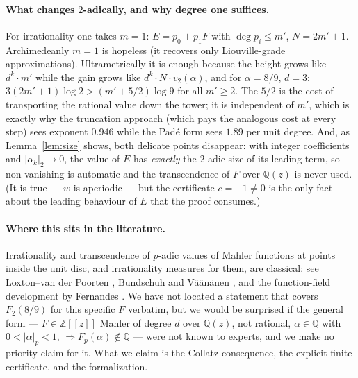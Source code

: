 \documentclass[11pt]{article}
\theoremstyle{definition}
\newcommand{\Z}{\mathbb{Z}}
\newcommand{\Q}{\mathbb{Q}}
\begin{document}
\paragraph{What changes $2$-adically, and why degree one suffices.}
For irrationality one takes $m = 1$: $E = p_0 + p_1 F$ with $\deg p_i
\le m'$, $N = 2m' + 1$. Archimedeanly $m = 1$ is hopeless (it recovers
only Liouville-grade approximations). Ultrametrically it is enough
because the height grows like $d^k \cdot m'$ while the gain grows like
$d^k \cdot N \cdot v_2(\alpha)$, and for $\alpha = 8/9$, $d = 3$:
$3(2m'+1)\log 2 > (m' + 5/2)\log 9$ for all $m' \ge 2$. The $5/2$ is
the cost of transporting the rational value down the tower; it is
independent of $m'$, which is exactly why the truncation approach
(which pays the analogous cost at every step) sees exponent $0.946$
while the Pad\'e form sees $1.89$ per unit degree. And, as
Lemma~\ref{lem:size} shows, both delicate points disappear: with
integer coefficients and $|\alpha_k|_2 \to 0$, the value of $E$ has
\emph{exactly} the $2$-adic size of its leading term, so non-vanishing
is automatic and the transcendence of $F$ over $\Q(z)$ is never used.
(It is true --- $w$ is aperiodic --- but the certificate $c = -1 \ne 0$
is the only fact about the leading behaviour of $E$ that the proof
consumes.)

\paragraph{Where this sits in the literature.} Irrationality and
transcendence of $p$-adic values of Mahler functions at points inside
the unit disc, and irrationality measures for them, are classical:
see Loxton--van der Poorten \cite{lvdp}, Bundschuh and V\"a\"an\"anen
\cite{bv}, and the function-field development by Fernandes
\cite{fernandes}. We have not located a statement that covers
$F_2(8/9)$ for this specific $F$ verbatim, but we would be surprised
if the general form --- $F \in \Z[[z]]$ Mahler of degree $d$ over
$\Q(z)$, not rational, $\alpha \in \Q$ with $0 < |\alpha|_p < 1$,
$\Rightarrow F_p(\alpha) \notin \Q$ --- were not known to experts,
and we make no priority claim for it. What we claim is the Collatz
consequence, the explicit finite certificate, and the formalization.
\end{document}
